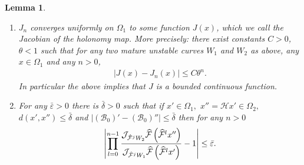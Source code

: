 \documentclass[10pt]{amsart}
\newtheorem{lemm}[theo]{Lemma}\newtheorem{prop}[theo]{Proposition}\newtheorem{coro}[theo]{Corollary}\newtheorem{conj}[theo]{Conjecture}
\theoremstyle{definition}\newtheorem{defi}[theo]{Definition}\newtheorem{rema}[theo]{Remark}\newtheorem{exam}[theo]{Example}\newtheorem{exem}[theo]{Example}\newtheorem{nota}[theo]{Notation}
\newcommand{\cB}{\mathcal{B}}
\newcommand{\pslope}{\mathcal{B}}
\newcommand{\cm}{\mathcal{F}}
\newcommand{\hol}{\mathcal{H}}
\newcommand{\cmp}{\hat\cm}
\newcommand{\breps}{\bar{\varepsilon}}
\newcommand{\brdelta}{\bar{\delta}}
\newcommand{\ppPrivate}[2]{#1^{#2}}
\newcommand{\prePrivate}[1]{\ppPrivate{#1}{-}}
\newcommand{\prpslope}{\prePrivate{\pslope}}
\newcommand{\jac}[1]{\mathcal{J}_{#1}}
\renewcommand{\prpslope}{\cB}
\renewcommand{\prpslope}{\cB}
\renewcommand{\prpslope}{\cB}
\newcommand*{\relabel}{\renewcommand{\labelenumi}{(\theenumi)}}
\newcommand*{\alphenumi}{\renewcommand*{\theenumi}{\alph{enumi}}\relabel}
\let\oldhat\hat
\renewcommand*{\hat}[1]{\mathchoice{\widehat{#1}}{\widehat{#1}}{\oldhat{#1}}{\oldhat{#1}}}
\begin{document}
\pagebreak
\begin{lemm}\label{LmJak}\leavevmode
\begin{enumerate}\alphenumi
\item\label{lemm5.12.1} $J_{n}$ converges uniformly on $\Omega_{1}$ to some function $J(x)$, which we call the \emph{Jacobian of the holonomy map}. More precisely: there exist constants $C>0$, $\theta<1$ such that for any two mature unstable curves $W_{1}$ and $W_{2}$ as above, any $x\in\Omega_{1}$ and any $n > 0$,
\begin{align*}
\left|J(x)-J_{n}(x) \right| \leq C \theta^n.
\end{align*}
In particular the above implies that $J$ is a bounded continuous function.

\item\label{lemm5.12.2} For any $\breps>0$ there is $ \brdelta>0$ such that if $x'\in \Omega_1,$ $x'' = \hol{}x'\in \Omega_2, $ $d(x', x'')\leq \brdelta$ and $|(\prpslope_0)'-(\prpslope_0)''|\leq \brdelta$ then for any $n > 0$
\begin{align*}
\left| \prod_{l=0}^{n-1} \frac{\jac{\cmp^{j}W_{2}}\cmp\left(\cmp^l x''\right)} {\jac{\cmp^{j}W_{1}}\cmp\left(\cmp^l x'\right)}-1\right|\leq\breps.
\end{align*}
\end{enumerate}
\end{lemm}
\end{document}
